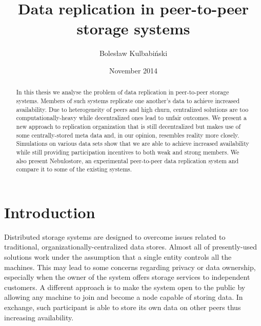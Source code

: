 \documentclass{pracamgren}
\author{Bolesław Kulbabiński}
\title{Data replication in peer-to-peer storage systems}
\date{November 2014}
\begin{document}
 \maketitle

\begin{abstract} 
In this thesis we analyse the problem of data replication in peer-to-peer storage systems. Members of such systems replicate one another's data to achieve increased availability. Due to heterogeneity of peers and high churn, centralized solutions are too computationally-heavy while decentralized ones lead to unfair outcomes. We present a new approach to replication organization that is still decentralized but makes use of some centrally-stored meta data and, in our opinion, resembles reality more closely. Simulations on various data sets show that we are able to achieve increased availability while still providing participation incentives to both weak and strong members. We also present Nebulostore, an experimental peer-to-peer data replication system and compare it to some of the existing systems.
\end{abstract}


\tableofcontents


\chapter*{Introduction}\label{chap::introduction}

Distributed storage systems are designed to overcome issues related to traditional, organizationally-centralized data stores.
Almost all of presently-used solutions work under the assumption that a single entity controls all the machines. This may lead to some concerns regarding privacy or data ownership, especially when the owner of the system offers storage services to independent customers.
A different approach is to make the system open to the public by allowing any machine to join and become a node capable of storing data. In exchange, such participant is able to store its own data on other peers thus increasing availability.\\
\end{document}
